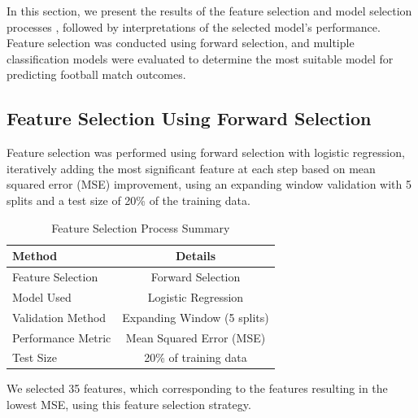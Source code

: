 In this section, we present the results of the feature selection and model selection processes \cite{GuyonElisseeff2003} \cite{ChandrashekarSahin2014}, followed by interpretations of the selected model's performance. Feature selection was conducted using forward selection, and multiple classification models were evaluated to determine the most suitable model for predicting football match outcomes.

\subsection{Feature Selection Using Forward Selection}
\label{subsec:feature_selection}

Feature selection was performed using forward selection with logistic regression, iteratively adding the most significant feature at each step based on mean squared error (MSE) improvement, using an expanding window validation with 5 splits and a test size of 20\% of the training data.

\begin{table}[H]
    \centering
    \caption{Feature Selection Process Summary}
    \label{tab:feature_selection_summary}
    \begin{tabular}{lc}
        \toprule
        \textbf{Method} & \textbf{Details} \\
        \midrule
        Feature Selection & Forward Selection \\
        Model Used & Logistic Regression \\
        Validation Method & Expanding Window (5 splits) \\
        Performance Metric & Mean Squared Error (MSE) \\
        Test Size & 20\% of training data \\
        \bottomrule
    \end{tabular}
\end{table}


We selected 35 features, which corresponding to the features resulting in the lowest MSE, using this feature selection strategy.

